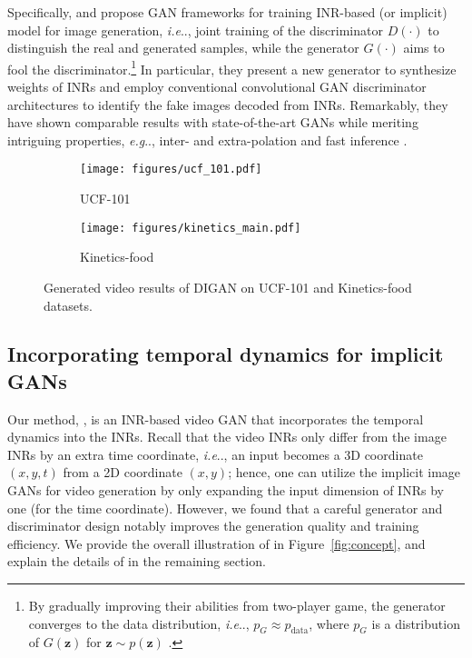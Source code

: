 \documentclass{article} \usepackage{iclr2022_conference,times}
\makeatletter
\DeclareRobustCommand\onedot{\futurelet\@let@token\@onedot}
\def\@onedot{\ifx\@let@token.\else.\null\fi\xspace}
\def\eg{\emph{e.g}\onedot} \def\Eg{\emph{E.g}\onedot}
\def\ie{\emph{i.e}\onedot} \def\Ie{\emph{I.e}\onedot}
\makeatother
\begin{document}
Specifically, \citet{skorokhodov2021adversarial} and \citet{anokhin2021image} propose GAN frameworks for training INR-based (or implicit) model for image generation, \ie, joint training of the discriminator $D(\cdot)$ to distinguish the real and generated samples, while the generator $G(\cdot)$ aims to fool the discriminator.\footnote{By gradually improving their abilities from two-player game, the generator converges to the data distribution, \ie, $p_G \approx p_\text{data}$, where $p_G$ is a distribution of $G(\bm{z})$ for $\bm{z} \sim p(\bm{z})$ \citep{mescheder2018training}.}
In particular, they present a new generator to synthesize weights of INRs and employ conventional convolutional GAN discriminator architectures to identify the fake images decoded from INRs. Remarkably, they have shown comparable results with state-of-the-art GANs while meriting intriguing properties, \eg, inter- and extra-polation and fast inference \citep{skorokhodov2021adversarial}.


\begin{figure*}[t]
\centering\small
\begin{subfigure}{\textwidth}
\centering
\texttt{[image: figures/ucf\_101.pdf]}
\caption{UCF-101} 
\end{subfigure}
\begin{subfigure}{\textwidth}
\centering
\texttt{[image: figures/kinetics\_main.pdf]}
\caption{Kinetics-food} 
\end{subfigure}
\caption{
Generated video results of DIGAN on UCF-101 and Kinetics-food datasets.
}\label{fig:main}
\vspace{-0.15in}
\end{figure*}



 
\subsection{Incorporating temporal dynamics for implicit GANs}
\label{subsec:method-ours}

Our method, \sname, is an INR-based video GAN that incorporates the temporal dynamics into the INRs. Recall that the video INRs only differ from the image INRs by an extra time coordinate, \ie, an input becomes a 3D coordinate $(x,y,t)$ from a 2D coordinate $(x,y)$; hence, one can utilize the implicit image GANs for video generation by only expanding the input dimension of INRs by one (for the time coordinate). However, we found that a careful generator and discriminator design notably improves the generation quality and training efficiency. We provide the overall illustration of \sname in Figure~\ref{fig:concept}, and explain the details of \sname in the remaining section.
\end{document}
